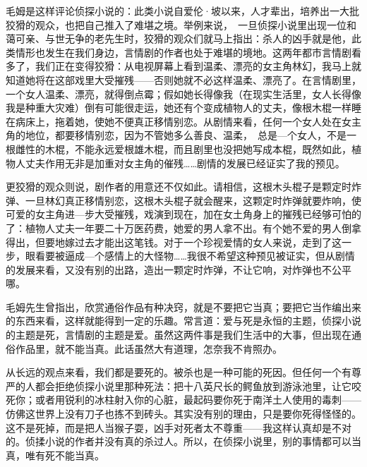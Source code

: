 毛姆是这样评论侦探小说的：此类小说自爱伦·坡以来，人才辈出，培养出一大批狡猾的观众，也把自己推入了难堪之境。举例来说，　一旦侦探小说里出现一位和蔼可亲、与世无争的老先生时，狡猾的观众们就马上指出：杀人的凶手就是他，此类情形也发生在我们身边，言情剧的作者也处于难堪的境地。这两年都市言情剧看多了，我们正在变得狡猾：从电视屏幕上看到温柔、漂亮的女主角林幻，我马上就知道她将在这部戏里大受摧残——否则她就不必这样温柔、漂亮了。在言情剧里，一个女人温柔、漂亮，就得倒点霉；假如她长得像我（在现实生活里，女人长得像我是种重大灾难）倒有可能很走运，她还有个变成植物人的丈夫，像根木棍一样睡在病床上，拖着她，使她不便真正移情别恋。从剧情来看，任何一个女人处在女主角的地位，都要移情别恋，因为不管她多么善良、温柔，　总是—个女人，不是一根雌性的木棍，不能永远爱根雄木棍，而且剧里也没把她写成本棍，既然如此，植物人丈夫作用无非是加重对女主角的催残……剧情的发展已经证实了我的预见。 

更狡猾的观众则说，剧作者的用意还不仅如此。请相信，这根木头棍子是颗定时炸弹、一旦林幻真正移情别恋，这根木头棍子就会醒来，这颗定时炸弹就要炸响，使可爱的女主角进—步大受摧残，戏演到现在，加在女土角身上的摧残已经够可怕的了：植物人丈夫一年要二十万医药费，她爱的男人拿不出。有个她不爱的男人倒拿得出，但要地嫁过去才能出这笔钱。对于一个珍视爱情的女人来说，走到了这一步，眼看要被逼成—个感情上的大怪物……我很不希望这种预见被证实，但从剧情的发展来看，又没有别的出路，造出一颗定时炸弹，不让它响，对炸弹也不公平哪。 

毛姆先生曾指出，欣赏通俗作品有种决窍，就是不要把它当真；要把它当作编出来的东西来看，这样就能得到一定的乐趣。常言道：爱与死是永恒的主题，侦探小说的主题是死，言情剧的主题是爱。虽然这两件事是我们生活中的大事，但出现在通俗作品里，就不能当真。此话虽然大有道理，怎奈我不肯照办。 

从长远的观点来看，我们都是要死的。被杀也是一种可能的死因。但任何一个有尊严的人都会拒绝侦探小说里那种死法：把十八英尺长的鳄鱼放到游泳池里，让它咬死你；或者用锐利的冰柱射入你的心脏，最起码要你死于南洋土人使用的毒刺——仿佛这世界上没有刀子也拣不到砖头。其实没有别的理由，只是要你死得怪怪的。这不是死掉，而是把人当猴子耍，凶手对死者太不尊重——我这样认真却是不对的。侦揉小说的作者并没有真的杀过人。所以，在侦探小说里，别的事情都可以当真，唯有死不能当真。 

